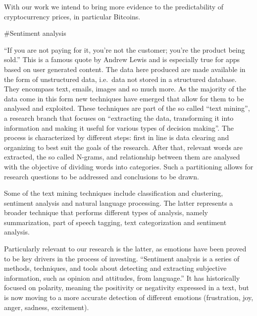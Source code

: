 \documentclass[
]{article}
\begin{document}
With our work we intend to bring more evidence to the predictability of
cryptocurrency prices, in particular Bitcoins.

\#Sentiment analysis

``If you are not paying for it, you're not the customer; you're the
product being sold.'' This is a famous quote by Andrew Lewis and is
especially true for apps based on user generated content. The data here
produced are made available in the form of unstructured data, i.e.~data
not stored in a structured database. They encompass text, emails, images
and so much more. As the majority of the data come in this form new
techniques have emerged that allow for them to be analysed and
exploited. These techniques are part of the so called ``text mining'', a
research branch that focuses on ``extracting the data, transforming it
into information and making it useful for various types of decision
making''. \autocite{bachTextMiningBig2019} The process is characterized
by different steps: first in line is data clearing and organizing to
best suit the goals of the research. After that, relevant words are
extracted, the so called N-grams, and relationship between them are
analysed with the objective of dividing words into categories. Such a
partitioning allows for research questions to be addressed and
conclusions to be drawn.

Some of the text mining techniques include classification and
clustering, sentiment analysis and natural language processing. The
latter represents a broader technique that performs different types of
analysis, namely summarization, part of speech tagging, text
categorization and sentiment analysis.

Particularly relevant to our research is the latter, as emotions have
been proved to be key drivers in the process of investing. ``Sentiment
analysis is a series of methods, techniques, and tools about detecting
and extracting subjective information, such as opinion and attitudes,
from language.''\autocite{mantylaEvolutionSentimentAnalysis2018} It has
historically focused on polarity, meaning the positivity or negativity
expressed in a text, but is now moving to a more accurate detection of
different emotions (frustration, joy, anger, sadness, excitement).
\end{document}
